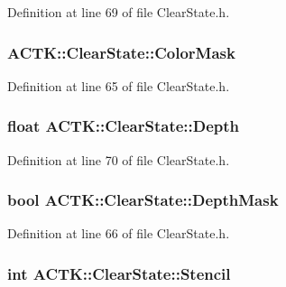 Definition at line 69 of file Clear\-State.\-h.

\hypertarget{struct_a_c_t_k_1_1_clear_state_a5a50a81a2a4e509dfc145525e6ee5fc4}{
\subsubsection[{Color\-Mask}]{ A\-C\-T\-K\-::\-Clear\-State\-::\-Color\-Mask}}\label{struct_a_c_t_k_1_1_clear_state_a5a50a81a2a4e509dfc145525e6ee5fc4}


Definition at line 65 of file Clear\-State.\-h.

\hypertarget{struct_a_c_t_k_1_1_clear_state_a02b345a3bfcbfbe52659ffb53ae340a7}{
\subsubsection[{Depth}]{\setlength{\rightskip}{0pt plus 5cm}float A\-C\-T\-K\-::\-Clear\-State\-::\-Depth}}\label{struct_a_c_t_k_1_1_clear_state_a02b345a3bfcbfbe52659ffb53ae340a7}


Definition at line 70 of file Clear\-State.\-h.

\hypertarget{struct_a_c_t_k_1_1_clear_state_a818d3e6ff82c541ebe2b9c2eb80c04c4}{
\subsubsection[{Depth\-Mask}]{\setlength{\rightskip}{0pt plus 5cm}bool A\-C\-T\-K\-::\-Clear\-State\-::\-Depth\-Mask}}\label{struct_a_c_t_k_1_1_clear_state_a818d3e6ff82c541ebe2b9c2eb80c04c4}


Definition at line 66 of file Clear\-State.\-h.

\hypertarget{struct_a_c_t_k_1_1_clear_state_a6ccd42a6540bacd267cff6566b4cfa10}{
\subsubsection[{Stencil}]{\setlength{\rightskip}{0pt plus 5cm}int A\-C\-T\-K\-::\-Clear\-State\-::\-Stencil}}\label{struct_a_c_t_k_1_1_clear_state_a6ccd42a6540bacd267cff6566b4cfa10}


